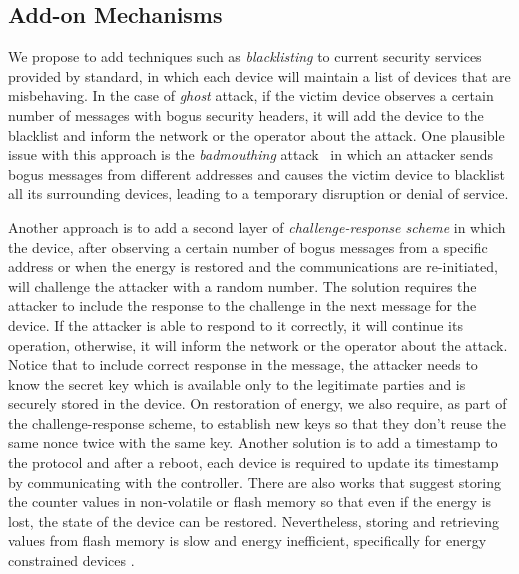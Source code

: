 \documentclass[10pt,journal,cspaper,compsoc]{IEEEtran}
\begin{document}
\subsection{Add-on Mechanisms}\label{sec:addonmechanisms}
We propose to add techniques such as {\em blacklisting} to current security services provided by standard, in which each device will maintain a list of devices that are misbehaving. In the case of {\em ghost} attack, if the victim device observes a certain number of messages with bogus security headers, it will add the device to the blacklist and inform the network or the operator about the attack. One plausible issue with this approach is the {\em badmouthing} attack~\cite{DEVU} in which an attacker sends bogus messages from different addresses and causes the victim device to blacklist all its surrounding devices, leading to a temporary disruption or denial of service.

Another approach is to add a second layer of {\em challenge-response scheme} in which the device, after observing a certain number of bogus messages from a specific address or when the energy is restored and the communications are re-initiated, will challenge the attacker with a random number. The solution requires the attacker to include the response to the challenge in the next message for the device. If the attacker is able to respond to  it correctly, it will continue its operation, otherwise, it will inform the network or the operator about the attack. Notice that to include correct response in the message, the attacker needs to know the secret key which is available only to the legitimate parties and is securely stored in the device. On restoration of energy, we also require, as part of the challenge-response scheme,  to establish new keys so that they don't reuse the same nonce twice with the same key. Another solution is to add a timestamp to the protocol and after a reboot, each device is required to update its timestamp by communicating with the controller. There are also works that suggest storing the counter values in non-volatile or flash memory so that even if the energy is lost, the state of the device can be restored. Nevertheless, storing and retrieving values from flash memory is slow and energy inefficient, specifically for energy constrained devices \cite{Sastry}.
\end{document}
